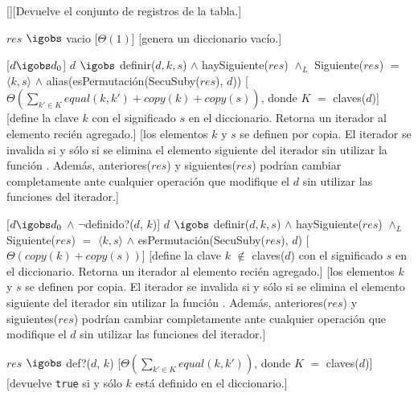 \documentclass[a4paper,10pt]{article}
\begin{document}
\begin{Interfaz}
    [][Devuelve el conjunto de registros de la tabla.]
 




  {$res$ $\igobs$ vacio}%
  [$\Theta(1)$]
  [genera un diccionario vacío.]

  [$d \igobs d_0$]
  {$d$ $\igobs$ definir($d, k, s$) $\land$ haySiguiente($res$) $\land_L$ Siguiente($res$) $=$ $\langle k,s\rangle$ $\land$ alias(esPermutación(SecuSuby($res$), $d$))}
  [$\displaystyle\Theta\left(\sum_{k' \in K}equal(k,k') + copy(k) + copy(s)\right)$, donde $K$ $=$ claves($d$)]
  [define la clave $k$ con el significado $s$ en el diccionario.  Retorna un iterador al elemento recién agregado.]
  [los elementos $k$ y $s$ se definen por copia.  El iterador se invalida si y sólo si se elimina el elemento siguiente del iterador sin utilizar la función . Además, anteriores($res$) y siguientes($res$) podrían cambiar completamente ante cualquier operación que modifique el $d$ sin utilizar las funciones del iterador.]


  [$d \igobs d_0$ $\land$ $\lnot$definido?($d$, $k$)]
  {$d$ $\igobs$ definir($d, k, s$) $\land$ haySiguiente($res$) $\land_L$ Siguiente($res$) $=$ $\langle k,s\rangle$ $\land$ esPermutación(SecuSuby($res$), $d$)}
  [$\Theta(copy(k) + copy(s))$]
  [define la clave $k$ $\not\in$ claves($d$) con el significado $s$ en el diccionario. Retorna un iterador al elemento recién agregado.]
  [los elementos $k$ y $s$ se definen por copia. El iterador se invalida si y sólo si se elimina el elemento siguiente del iterador sin utilizar la función . Además, anteriores($res$) y siguientes($res$) podrían cambiar completamente ante cualquier operación que modifique el $d$ sin utilizar las funciones del iterador.]

  {$res$ $\igobs$ def?($d$, $k$)}
  [$\Theta(\sum_{k' \in K}equal(k,k'))$, donde $K$ $=$ claves($d$)]
  [devuelve \texttt{true} si y sólo $k$ está definido en el diccionario.]


\end{Interfaz}
\end{document}
